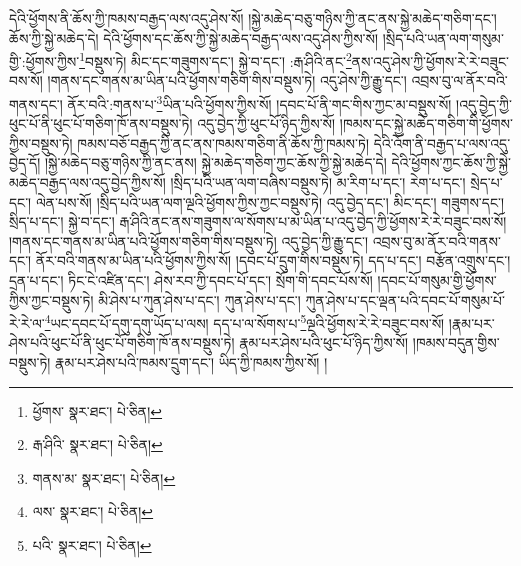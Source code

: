 དེའི་ཕྱོགས་ནི་ཆོས་ཀྱི་ཁམས་བརྒྱད་ལས་འདུ་ཤེས་སོ། །སྐྱེ་མཆེད་བཅུ་གཉིས་ཀྱི་ནང་ནས་སྐྱེ་མཆེད་གཅིག་དང་། ཆོས་ཀྱི་སྐྱེ་མཆེད་དེ། དེའི་ཕྱོགས་དང་ཆོས་ཀྱི་སྐྱེ་མཆེད་བརྒྱད་ལས་འདུ་ཤེས་ཀྱིས་སོ། །སྲིད་པའི་ཡན་ལག་གསུམ་གྱི་:ཕྱོགས་ཀྱིས་\footnote{ཕྱོགས་  སྣར་ཐང་།  པེ་ཅིན། }བསྡུས་ཏེ། མིང་དང་གཟུགས་དང་། སྐྱེ་བ་དང་། :རྒ་ཤིའི་ནང་\footnote{རྒ་ཤིའི་  སྣར་ཐང་།  པེ་ཅིན། }ནས་འདུ་ཤེས་ཀྱི་ཕྱོགས་རེ་རེ་བཟུང་བས་སོ། །གནས་དང་གནས་མ་ཡིན་པའི་ཕྱོགས་གཅིག་གིས་བསྡུས་ཏེ། འདུ་ཤེས་ཀྱི་རྒྱུ་དང་། འབྲས་བུ་ལ་ནོར་བའི་གནས་དང་། ནོར་བའི་:གནས་པ་\footnote{གནས་མ་  སྣར་ཐང་།  པེ་ཅིན། }ཡིན་པའི་ཕྱོགས་ཀྱིས་སོ། །དབང་པོ་ནི་གང་གིས་ཀྱང་མ་བསྡུས་སོ། །འདུ་བྱེད་ཀྱི་ཕུང་པོ་ནི་ཕུང་པོ་གཅིག་ཁོ་ནས་བསྡུས་ཏེ། འདུ་བྱེད་ཀྱི་ཕུང་པོ་ཉིད་ཀྱིས་སོ། །ཁམས་དང་སྐྱེ་མཆེད་གཅིག་གི་ཕྱོགས་ཀྱིས་བསྡུས་ཏེ། ཁམས་བཅོ་བརྒྱད་ཀྱི་ནང་ནས་ཁམས་གཅིག་ནི་ཆོས་ཀྱི་ཁམས་ཏེ། དེའི་འོག་ནི་བརྒྱད་པ་ལས་འདུ་བྱེད་དོ། །སྐྱེ་མཆེད་བཅུ་གཉིས་ཀྱི་ནང་ནས། སྐྱེ་མཆེད་གཅིག་ཀྱང་ཆོས་ཀྱི་སྐྱེ་མཆེད་དེ། དེའི་ཕྱོགས་ཀྱང་ཆོས་ཀྱི་སྐྱེ་མཆེད་བརྒྱད་ལས་འདུ་བྱེད་ཀྱིས་སོ། །སྲིད་པའི་ཡན་ལག་བཞིས་བསྡུས་ཏེ། མ་རིག་པ་དང་། རེག་པ་དང་། སྲེད་པ་དང་། ལེན་པས་སོ། །སྲིད་པའི་ཡན་ལག་ལྔའི་ཕྱོགས་ཀྱིས་ཀྱང་བསྡུས་ཏེ། འདུ་བྱེད་དང་། མིང་དང་། གཟུགས་དང་། སྲིད་པ་དང་། སྐྱེ་བ་དང་། རྒ་ཤིའི་ནང་ནས་གཟུགས་ལ་སོགས་པ་མ་ཡིན་པ་འདུ་བྱེད་ཀྱི་ཕྱོགས་རེ་རེ་བཟུང་བས་སོ། །གནས་དང་གནས་མ་ཡིན་པའི་ཕྱོགས་གཅིག་གིས་བསྡུས་ཏེ། འདུ་བྱེད་ཀྱི་རྒྱུ་དང་། འབྲས་བུ་མ་ནོར་བའི་གནས་དང་། ནོར་བའི་གནས་མ་ཡིན་པའི་ཕྱོགས་ཀྱིས་སོ། །དབང་པོ་དྲུག་གིས་བསྡུས་ཏེ། དད་པ་དང་། བརྩོན་འགྲུས་དང་། དྲན་པ་དང་། ཏིང་ངེ་འཛིན་དང་། ཤེས་རབ་ཀྱི་དབང་པོ་དང་། སྲོག་གི་དབང་པོས་སོ། །དབང་པོ་གསུམ་གྱི་ཕྱོགས་ཀྱིས་ཀྱང་བསྡུས་ཏེ། མི་ཤེས་པ་ཀུན་ཤེས་པ་དང་། ཀུན་ཤེས་པ་དང་། ཀུན་ཤེས་པ་དང་ལྡན་པའི་དབང་པོ་གསུམ་པོ་རེ་རེ་ལ་\footnote{ལས་  སྣར་ཐང་།  པེ་ཅིན། }ཡང་དབང་པོ་དགུ་དགུ་ཡོད་པ་ལས། དད་པ་ལ་སོགས་པ་\footnote{པའི་  སྣར་ཐང་།  པེ་ཅིན། }ལྔའི་ཕྱོགས་རེ་རེ་བཟུང་བས་སོ། །རྣམ་པར་ཤེས་པའི་ཕུང་པོ་ནི་ཕུང་པོ་གཅིག་ཁོ་ནས་བསྡུས་ཏེ། རྣམ་པར་ཤེས་པའི་ཕུང་པོ་ཉིད་ཀྱིས་སོ། །ཁམས་བདུན་གྱིས་བསྡུས་ཏེ། རྣམ་པར་ཤེས་པའི་ཁམས་དྲུག་དང་། ཡིད་ཀྱི་ཁམས་ཀྱིས་སོ། །
